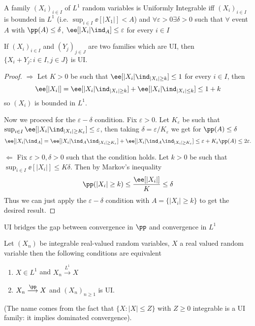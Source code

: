 \documentclass[../main.tex]{subfiles}
\begin{document}
\begin{theorem}
  A family $(X_i)_{i \in I}$ of $L^1$ random variables is Uniformly Integrable
  iff 
  $(X_i)_{i \in I}$ is bounded in $L^1$ (i.e. $\sup_{i \in I} \ee[|X_1|] < A$)
  and $\forall \varepsilon > 0 \exists \delta > 0$ such that $\forall$ event $A$
  with $\pp(A) \leq \delta$, $\ee[|X_i| \ind_{A}] \leq \varepsilon$ for every $i
  \in I$
\end{theorem}
\begin{corollary}
  If $(X_i)_{i \in I}$ and $(Y_j)_{j \in J}$ are two families which are UI, then
  $\{ X_i + Y_j \colon i \in I, j \in J \} $ is UI.
\end{corollary}
\begin{proof}
  $\boxed{\Rightarrow}$
  Let $K > 0$ be such that $\ee[|X_i| \ind_{|X_i| \geq k}] \leq 1$ for every $i
  \in I$, then 
  $$
  \ee[|X_i|] = \ee[|X_i| \ind_{|X_i| \geq k}] + \ee[|X_i| \ind_{|X_i| \leq k}]
  \leq 1 + k
  $$ 
  so $(X_i)$ is bounded in $L^1$.

  \vspace{0.5em}

  \noindent Now we proceed for the $\varepsilon-\delta$ condition. Fix
  $\varepsilon > 0$. Let $K_{\varepsilon}$ be such that $\sup_{i \in I}
  \ee[|X_i| \ind_{|X_i| \geq K_{\varepsilon}}] \leq \varepsilon$, then taking
  $\delta = \varepsilon / K_{\varepsilon}$ we get for $\pp(A) \leq \delta$
  \[
    \ee[|X_i| \ind_A] = 
    \ee[|X_i| \ind_A \ind_{|X_i| \geq K_{\varepsilon}}] +
    \ee[|X_i| \ind_A \ind_{|X_i| \geq K_{\varepsilon}}] 
    \leq \varepsilon + K_{\varepsilon}\pp(A) \leq 2 \varepsilon
  .\] 

  \vspace{1em}
  $\boxed{\Leftarrow}$ Fix $\varepsilon > 0, \delta > 0$ such that the condition
  holds. Let $k > 0$ be such that $\sup_{i \in I}\ee[|X_i|] \leq K \delta$. Then
  by Markov's inequality
  \[
    \pp(|X_i| \geq k) \leq \frac{\ee[|X_i|]}{K} \leq \delta 
  \] 
  Thus we can just apply the $\varepsilon-\delta$ condition with $A = \{ |X_i|
  \geq k \} $ to get the desired result.
\end{proof}

UI bridges the gap between convergence in $\pp$ and convergence in $L^1$

\begin{theorem}
  Let $(X_n)$ be integrable real-valued random variables, $X$ a real valued
  random variable then the following conditions are equivalent
  \begin{enumerate}
    \item $X \in L^1$ and $X_n \overset{L^1}{\longrightarrow} X$
    \item $X_n \overset{\pp}{\longrightarrow} X$ and $(X_n)_{n \geq 1}$ is UI.
  \end{enumerate}
\end{theorem}
(The name comes from the fact that $\{ X \colon |X| \leq Z \} $ with $Z \geq 0$
integrable is a UI family: it implies dominated convergence).
\end{document}
